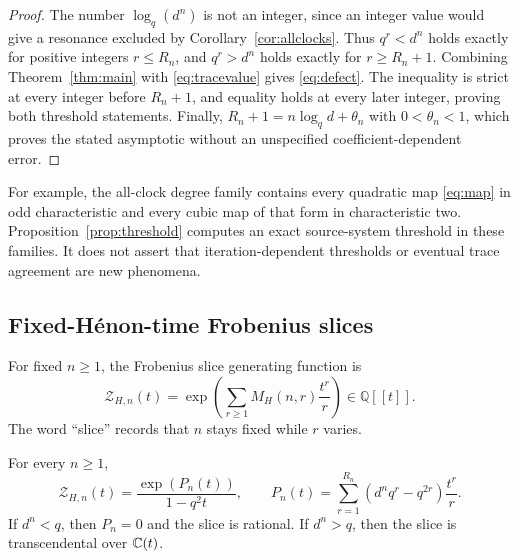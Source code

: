 \begin{proof}
The number $\log_q(d^n)$ is not an integer, since an integer value
would give a resonance excluded by Corollary~\ref{cor:allclocks}.
Thus $q^r<d^n$ holds exactly for positive integers $r\leq R_n$,
and $q^r>d^n$ holds exactly for $r\geq R_n+1$. Combining
Theorem~\ref{thm:main} with \eqref{eq:tracevalue} gives
\eqref{eq:defect}. The inequality is strict at every integer before
$R_n+1$, and equality holds at every later integer, proving both
threshold statements. Finally,
$R_n+1=n\log_qd+\theta_n$ with $0<\theta_n<1$, which proves the
stated asymptotic without an unspecified coefficient-dependent error.
\end{proof}

For example, the all-clock degree family contains every quadratic map
\eqref{eq:map} in odd characteristic and every cubic map of that form
in characteristic two. Proposition~\ref{prop:threshold} computes an
exact source-system threshold in these families. It does not assert
that iteration-dependent thresholds or eventual trace agreement are
new phenomena.

\subsection{Fixed-H\'enon-time Frobenius slices}

\begin{definition}\label{def:slice}
For fixed $n\geq1$, the Frobenius slice generating function is
\begin{equation}\label{eq:slicedef}
 \mathcal Z_{H,n}(t)=
 \exp\!\left(\sum_{r\geq1}M_H(n,r)\frac{t^r}{r}\right)
 \in\mathbb Q[[t]].
\end{equation}
The word ``slice'' records that $n$ stays fixed while $r$ varies.
\end{definition}

\begin{proposition}\label{prop:slice}
For every $n\geq1$,
\begin{equation}\label{eq:sliceformula}
 \mathcal Z_{H,n}(t)=\frac{\exp(P_n(t))}{1-q^2t},
 \qquad
 P_n(t)=\sum_{r=1}^{R_n}(d^nq^r-q^{2r})\frac{t^r}{r}.
\end{equation}
If $d^n<q$, then $P_n=0$ and the slice is rational. If $d^n>q$,
then the slice is transcendental over $\mathbb C(t)$.
\end{proposition}

